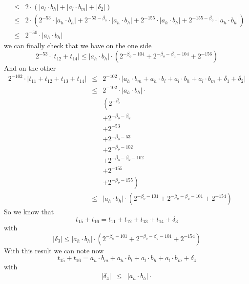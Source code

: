 \documentclass[a4paper,10pt,twoside]{article}
\newenvironment{proof}[1][Proof]{\begin{trivlist}
\item[\hskip \labelsep {\bfseries #1}]}{\end{trivlist}}
\newcommand{\hi}{\ensuremath{\mathit{h}}}
\newcommand{\mi}{\ensuremath{\mathit{m}}}
\newcommand{\lo}{\ensuremath{\mathit{l}}}
\begin{document}
\begin{proof}
\begin{eqnarray*}
& \leq & 2 \cdot \left( \left \vert a_\lo \cdot b_\hi \right \vert + \left \vert a_\lo \cdot b_\mi \right \vert + \left \vert \delta_2 \right \vert
\right) \\
& \leq & 2 \cdot \left( 2^{-53} \cdot \left \vert a_\hi \cdot b_\hi \right \vert +
2^{-53-\beta_o} \cdot \left \vert a_\hi \cdot b_\hi \right \vert +
2^{-155} \cdot \left \vert a_\hi \cdot b_\hi \right \vert +
2^{-155-\beta_o} \cdot \left \vert a_\hi \cdot b_\hi \right \vert
\right) \\
& \leq & 2^{-50} \cdot \left \vert a_\hi \cdot b_\hi \right \vert
\end{eqnarray*}
we can finally check that we have on the one side
$$2^{-53} \cdot \left \vert t_{12} + t_{14} \right \vert \leq \left \vert a_\hi \cdot b_\hi \right \vert \cdot
\left( 2^{-\beta_o-104} + 2^{-\beta_o-\beta_u-104} + 2^{-156} \right)$$
And on the other
\begin{eqnarray*}
2^{-102} \cdot \left \vert t_{11} + t_{12} + t_{13} + t_{14} \right \vert & \leq &
2^{-102} \cdot \left \vert a_\hi \cdot b_\mi + a_\hi \cdot b_\lo + a_\lo \cdot b_\hi + a_\lo \cdot b_\mi + \delta_1 + \delta_2 \right \vert \\
& \leq & 2^{-102} \cdot \left \vert a_\hi \cdot b_\hi \right \vert \cdot \\
& & \left( 2^{-\beta_o} \right. \\ & & + 2^{-\beta_o-\beta_u} \\ & & + 2^{-53} \\ & & + 2^{-\beta_o-53} \\ & & + 2^{-\beta_o-102} \\
& & + 2^{-\beta_o-\beta_u-102} \\ & & + 2^{-155} \\ & & \left. + 2^{-\beta_o-155} \right) \\
& \leq & \left \vert a_\hi \cdot b_\hi \right \vert \cdot \left(
2^{-\beta_o-101} + 2^{-\beta_o-\beta_u-101} + 2^{-154} \right)
\end{eqnarray*}
So we know that
$$t_{15} + t_{16} = t_{11} + t_{12} + t_{13} + t_{14} + \delta_3$$
with
$$\left \vert \delta_3 \right \vert \leq \left \vert a_\hi \cdot b_\hi \right \vert \cdot \left(
2^{-\beta_o-101} + 2^{-\beta_o-\beta_u-101} + 2^{-154} \right)$$
With this result we can note now
$$t_{15} + t_{16} = a_\hi \cdot b_\mi + a_\hi \cdot b_\lo + a_\lo \cdot b_\hi + a_\lo \cdot b_\mi + \delta_4$$
with
\begin{eqnarray*}
\left \vert \delta_4 \right \vert & \leq &
\left \vert a_\hi \cdot b_\hi \right \vert \cdot \\

\end{eqnarray*}
\end{proof}
\end{document}
